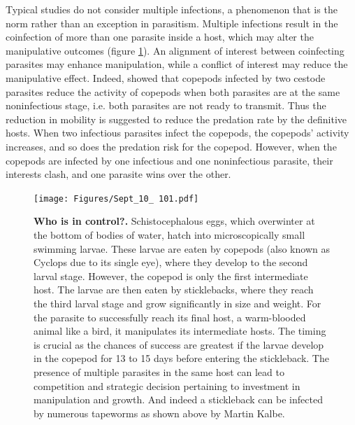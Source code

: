 \documentclass[11pt]{article}
\begin{document}
Typical studies do not consider multiple infections, a phenomenon that is the norm rather than an exception in parasitism. 
Multiple infections result in the coinfection of more than one parasite inside a host, which may alter the manipulative outcomes (figure \ref{fig:empirical}). 
An alignment of interest between coinfecting parasites may enhance manipulation, while a conflict of interest may reduce the manipulative effect. 
Indeed, \cite{Hafer:2015gl} showed that copepods infected by two cestode parasites reduce the activity of copepods when both parasites are at the same noninfectious stage, i.e. both parasites are not ready to transmit. 
Thus the reduction in mobility is suggested to reduce the predation rate by the definitive hosts. 
When two infectious parasites infect the copepods, the copepods' activity increases, and so does the predation risk for the copepod. 
However, when the copepods are infected by one infectious and one noninfectious parasite, their interests clash, and one parasite wins over the other. 

\begin{figure}[ht!]
\centering
\texttt{[image: Figures/Sept\_10\_ 101.pdf]}
\caption{\textbf{Who is in control?.}
Schistocephalous eggs, which overwinter at the bottom of bodies of water, hatch into microscopically small swimming larvae. 
These larvae are eaten by copepods (also known as Cyclops due to its single eye), where they develop to the second larval stage. 
However, the copepod is only the first intermediate host. 
The larvae are then eaten by sticklebacks, where they reach the third larval stage and grow significantly in size and weight. 
For the parasite to successfully reach its final host, a warm-blooded animal like a bird, it manipulates its intermediate hosts. 
The timing is crucial as the chances of success are greatest if the larvae develop in the copepod for 13 to 15 days before entering the stickleback. 
The presence of multiple parasites in the same host can lead to competition and strategic decision pertaining to investment in manipulation and growth.
And indeed a stickleback can be infected by numerous tapeworms as shown above by Martin Kalbe.
}
\label{fig:empirical}
\end{figure}
\end{document}

